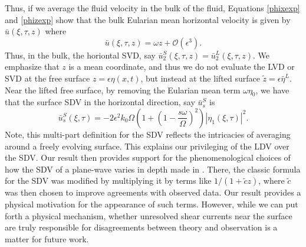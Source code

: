 \documentclass{JFM_Style/jfm}
\begin{document}
Thus, if we average the fluid velocity in the bulk of the fluid, Equations \eqref{phixexp} and \eqref{phizexp} show that the bulk Eularian mean horizontal velocity is given by $\bar{u}(\xi,\tau,z)$ where
\[
\bar{u}(\xi,\tau,z) = \omega z + \mathcal{O}(\epsilon^{3}).
\]
Thus, in the bulk, the horiontal SVD, say $\bar{u}^{S}_{2}(\xi,\tau,z) = \bar{u}^{L}_{2}(\xi,\tau,z)$.  We emphasize that $z$ is a mean coordinate, and thus we do not evaluate the LVD or SVD at the free surface $z=\epsilon \eta(x,t)$, but instead at the lifted surface $\tilde{z}=\epsilon \bar{\eta}^{L}$.  Near the lifted free surface, by removing the Eularian mean term $\omega \eta_{0}$, we have that the surface SDV in the horizontal direction, say $\bar{u}^{S}_{s}$ is 
\begin{equation}
\bar{u}^{S}_{s}(\xi,\tau) = -2\epsilon^{2}k_{0}\Omega\left(1 + \left(1-\frac{s\omega}{\Omega} \right)^{2}\right)|\eta_{1}(\xi,\tau)|^{2}.
\label{surfSDV}
\end{equation}
Note, this multi-part definition for the SDV reflects the intricacies of averaging around a freely evolving surface.  This explains our privileging of the LDV over the SDV.  Our result then provides support for the phenomenological choices of how the SDV of a plane-wave varies in depth made in \cite{breivik}.  There, the classic formula for the SDV was modified by multiplying it by terms like $1/(1+\tilde{c}z)$, where $\tilde{c}$ was then chosen to improve agreements with observed data.  Our result provides a physical motivation for the appearance of such terms.  However, while we can put forth a physical mechanism, whether unresolved shear currents near the surface are truly responsible for disagreements between theory and observation is a matter for future work.
\end{document}
